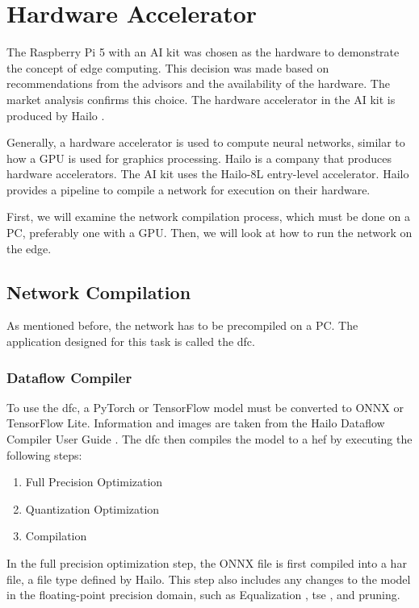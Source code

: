 \chapter{Hardware Accelerator}

The Raspberry Pi 5 with an AI kit was chosen as the hardware to demonstrate the concept of edge computing.  
This decision was made based on recommendations from the advisors and the availability of the hardware.  
The market analysis confirms this choice.  
The hardware accelerator in the AI kit is produced by Hailo \cite{hailo}.  

Generally, a hardware accelerator is used to compute neural networks, similar to how a GPU is used for graphics processing.  
Hailo is a company that produces hardware accelerators.  
The AI kit uses the Hailo-8L entry-level accelerator.  
Hailo provides a pipeline to compile a network for execution on their hardware.  

First, we will examine the network compilation process, which must be done on a PC, preferably one with a GPU.  
Then, we will look at how to run the network on the edge.  

\section{Network Compilation}

As mentioned before, the network has to be precompiled on a PC.  
The application designed for this task is called the \Acrfull{dfc}.  

\subsection{Dataflow Compiler  
\label{section:dfc}}  

To use the \acrshort{dfc}, a PyTorch or TensorFlow model must be converted to ONNX or TensorFlow Lite.  
Information and images are taken from the Hailo Dataflow Compiler User Guide \cite{hailo_dataflow_compiler}.  
The \acrshort{dfc} then compiles the model to a \Acrfull{hef} by executing the following steps:  

\begin{enumerate}
    \item Full Precision Optimization
    \item Quantization Optimization
    \item Compilation
\end{enumerate}

In the full precision optimization step, the ONNX file is first compiled into a \acrfull{har} file, a file type defined by Hailo.  
This step also includes any changes to the model in the floating-point precision domain, such as Equalization \cite{meller2019same}, \acrshort{tse} \cite{Vosco_2021_ICCV}, and pruning.  

